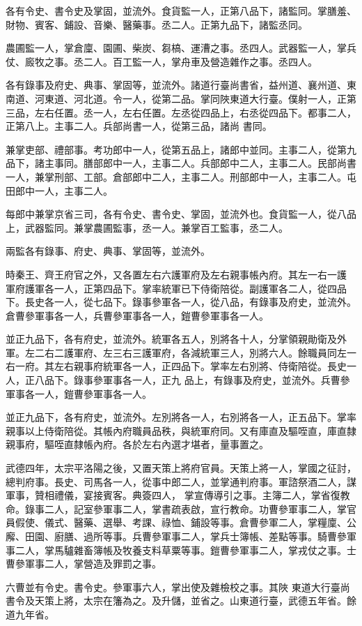 \begin{pinyinscope}
 各有令史、書令史及掌固，並流外。食貨監一人，正第八品下，諸監同。掌膳羞、財物、賓客、鋪設、音樂、醫藥事。丞二人。正第九品下，諸監丞同。



 農圃監一人，掌倉廩、園圃、柴炭、芻槁、運漕之事。丞四人。武器監一人，掌兵仗、廄牧之事。丞二人。百工監一人，掌舟車及營造雜作之事。丞四人。



 各有錄事及府史、典事、掌固等，並流外。諸道行臺尚書省，益州道、襄州道、東南道、河東道、河北道。令一人，從第二品。掌同陜東道大行臺。僕射一人，正第三品，左右任置。丞一人，左右任置。左丞從四品上，右丞從四品下。都事二人，正第八上。主事二人。兵部尚書一人，從第三品，諸尚
 書同。



 兼掌吏部、禮部事。考功郎中一人，從第五品上，諸郎中並同。主事二人，從第九品下，諸主事同。膳部郎中一人，主事二人。兵部郎中二人，主事二人。民部尚書一人，兼掌刑部、工部。倉部郎中二人，主事二人。刑部郎中一人，主事二人。屯田郎中一人，主事二人。



 每郎中兼掌京省三司，各有令史、書令史、掌固，並流外也。食貨監一人，從八品上，武器監同。兼掌農圃監事，丞一人。兼掌百工監事，丞二人。



 兩監各有錄事、府史、典事、掌固等，並流外。



 時秦王、齊王府官之外，又各置左右六護軍府及左右親事帳內府。其左一右一護
 軍府護軍各一人，正第四品下。掌率統軍已下侍衛陪從。副護軍各二人，從四品下。長史各一人，從七品下。錄事參軍各一人，從八品，有錄事及府史，並流外。倉曹參軍事各一人，兵曹參軍事各一人，鎧曹參軍事各一人。



 並正九品下，各有府史，並流外。統軍各五人，別將各十人，分掌領親勛衛及外軍。左二右二護軍府、左三右三護軍府，各減統軍三人，別將六人。餘職員同左一右一府。其左右親事府統軍各一人，正四品下。掌率左右別將、侍衛陪從。長史一人，正八品下。錄事參軍事各一人，正九
 品上，有錄事及府史，並流外。兵曹參軍事各一人，鎧曹參軍事各一人。



 並正九品下，各有府史，並流外。左別將各一人，右別將各一人，正五品下。掌率親事以上侍衛陪從。其帳內府職員品秩，與統軍府同。又有庫直及驅咥直，庫直隸親事府，驅咥直隸帳內府。各於左右內選才堪者，量事置之。



 武德四年，太宗平洛陽之後，又置天策上將府官員。天策上將一人，掌國之征討，總判府事。長史、司馬各一人，從事中郎二人，並掌通判府事。軍諮祭酒二人，謀軍事，贊相禮儀，宴接賓客。典簽四人，
 掌宣傳導引之事。主簿二人，掌省復教命。錄事二人，記室參軍事二人，掌書疏表啟，宣行教命。功曹參軍事二人，掌官員假使、儀式、醫藥、選舉、考課、祿恤、鋪設等事。倉曹參軍二人，掌糧廩、公廨、田園、廚膳、過所等事。兵曹參軍事二人，掌兵士簿帳、差點等事。騎曹參軍事二人，掌馬驢雜畜簿帳及牧養支料草粟等事。鎧曹參軍事二人，掌戎仗之事。士曹參軍事二人，掌營造及罪罰之事。



 六曹並有令史。書令史。參軍事六人，掌出使及雜檢校之事。其陜
 東道大行臺尚書令及天策上將，太宗在籓為之。及升儲，並省之。山東道行臺，武德五年省。餘道九年省。



\end{pinyinscope}